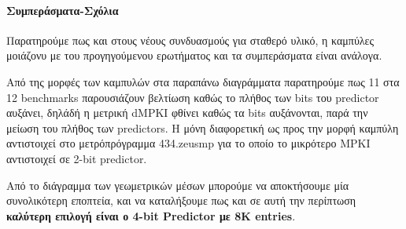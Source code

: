 \paragraph{Συμπεράσματα-Σχόλια}
   Παρατηρούμε πως και στους νέους συνδυασμούς για σταθερό υλικό, η καμπύλες 
   μοιάζονυ με του προγηγούμενου ερωτήματος και τα συμπεράσματα είναι ανάλογα.

    Από της μορφές των καμπυλών στα παραπάνω διαγράμματα παρατηρούμε πως 11 στα
    12 benchmarks παρουσιάζουν βελτίωση καθώς το πλήθος των bits του predictor
    αυξάνει, δηλάδή η μετρική dMPKI φθίνει καθώς τα bits αυξάνονται, παρά την
    μείωση του πλήθος των predictors. Η μόνη διαφορετική ως προς την μορφή
    καμπύλη αντιστοιχεί στο μετρόπρόγραμμα 434.zeusmp για το οποίο το μικρότερο
    MPKI αντιστοιχεί σε 2-bit predictor.

   Από το διάγραμμα των γεωμετρικών μέσων μπορούμε να αποκτήσουμε μία συνολικότερη εποπτεία, 
   και να καταλήξουμε πως και σε αυτή την περίπτωση
    \textbf{καλύτερη επιλογή είναι ο 4-bit Predictor με 8Κ entries}.

